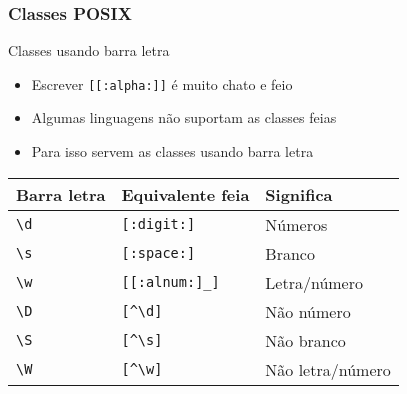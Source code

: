 \documentclass{beamer}
\begin{document}
\begin{frame}[fragile]
 \frametitle{Classes POSIX}
 \begin{block}{Classes usando barra letra}
  \begin{itemize}
   \item Escrever \texttt{[[:alpha:]]} é muito chato e feio
   \item Algumas linguagens não suportam as classes feias
   \item Para isso servem as classes usando barra letra
  \end{itemize}

  \pause
  \begin{center}
   \begin{tabular}{|l|l|l|}
	\hline
	\textbf{Barra letra} & \textbf{Equivalente feia} & \textbf{Significa} \\
	\hline
	\verb=\d= & \verb=[:digit:]= & Números \\
	\hline
	\verb=\s= & \verb=[:space:]= & Branco \\
	\hline
	\verb=\w= & \verb=[[:alnum:]_]= & Letra/número \\
	\hline
    \verb=\D= & \verb=[^\d]= & Não número \\
	\hline
    \verb=\S= & \verb=[^\s]= & Não branco \\
	\hline
    \verb=\W= & \verb=[^\w]= & Não letra/número \\
	\hline
   \end{tabular}
  \end{center}
 \end{block}
\end{frame}
\end{document}
